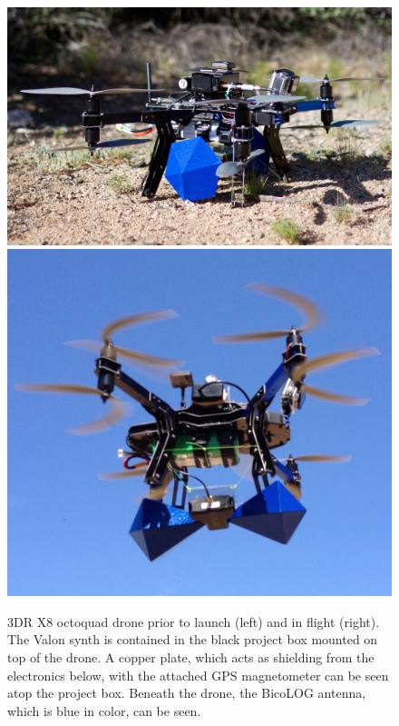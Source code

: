 \documentclass[preprint2]{aastex}
\begin{document}
\onecolumn
\begin{center}

\begin{figure}[h]
\centering
\includegraphics[scale=0.1]{images/drone2.jpg}
\includegraphics[scale=0.377]{images/drone.png}
\caption{3DR X8 octoquad drone prior to launch (left) and in flight (right).  The Valon synth is contained in the black project box mounted on top of the drone.  A copper plate, which acts as shielding from the electronics below, with the attached GPS magnetometer can be seen atop the project box. Beneath the drone, the BicoLOG antenna, which is blue in color, can be seen.}
\label{fig:drone}
\end{figure}


\end{center}
\end{document}
